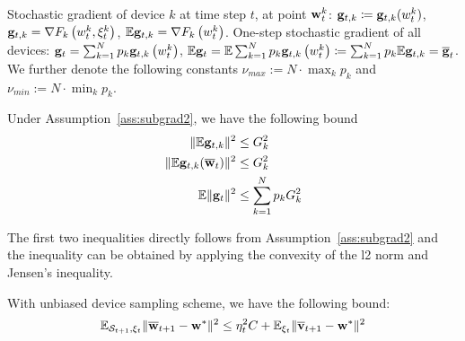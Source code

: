 Stochastic gradient of device $k$ at time step $t$, at point ${\mathbf{w}}_t^k$: 
	${\mathbf{g}}_{t,k} \coloneqq {\mathbf{g}}_{t,k}(w_t^k)$,
	$ {\mathbf{g}}_{t, k} = {\nabla} F_{k}\left(w_{t}^{k}, \xi_{t}^{k}\right) $,
	$\mathbb{E} {\mathbf{g}}_{t, k} = {\nabla} F_{k}\left(w_{t}^{k}\right)$.
One-step stochastic gradient of all devices:
${\mathbf{g}}_{t}=\sum_{k=1}^{N} p_{k} {\mathbf{g}}_{t, k}\left(w_{t}^{k}\right) $, $\mathbb{E} {\mathbf{g}}_{t}= \mathbb{E} \sum_{k=1}^{N} p_{k} {\mathbf{g}}_{t, k}\left(w_{t}^{k}\right) \coloneqq \sum_{k=1}^{N} p_{k} \mathbb{E} {\mathbf{g}}_{t, k} = {\overline{\mathbf{g}}}_t$.
We further denote the following constants $\nu_{max}:=N\cdot\max_{k}p_{k}$ and $\nu_{min}:=N\cdot\min_{k}p_{k}$. 


\begin{lemma}
Under Assumption~\ref{ass:subgrad2}, we have the following bound
\begin{align}
	 \|\mathbb{E} {\mathbf{g}}_{t,k}\|^2 & \leq G_k^2	\label{eq:g3} \\
	\|\mathbb{E} {\mathbf{g}}_{t,k}(\overline{{\mathbf{w}}}_t)\|^2 & \leq  G_k^2 \label{eq:g2} \\
   \mathbb{E}\| {\mathbf{g}}_{t} \|^{2} &  \leq  \sum_{k=1}^N p_k G_k^2  \label{eq:g1}
\end{align}
\label{lma:gradient}
\end{lemma}
The first two inequalities directly follows from Assumption~\ref{ass:subgrad2} and the inequality
can be obtained by applying the convexity of the l2 norm and Jensen's inequality. 

\begin{lemma}
	With unbiased device sampling scheme, we have the following bound: 
	$$ \mathbb{E}_{{\mathcal{S}}_{t+1}, \xi_{t}} \|\overline{{\mathbf{w}}}_{t+1} - {\mathbf{w}}^*\|^2 \leq \eta_t^2 C + \mathbb{E}_{\xi_t} \|\overline{{\mathbf{v}}}_{t+1} - {\mathbf{w}}^*\|^2 $$
\label{lma:wdistance}
\end{lemma}

